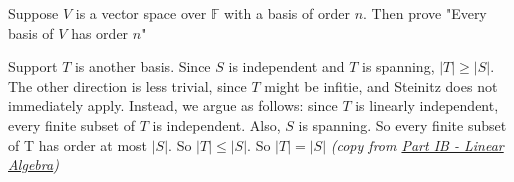 \documentclass[10pt, a4paper]{article}
\begin{document}
\begin{question}
Suppose $V$ is a vector space over $\mathbb{F}$ with a basis of order $n$. Then prove "Every basis of $V$ has order $n$" 
\end{question}

\begin{My Answer}
Support $T$ is another basis. Since $S$ is independent and $T$ is spanning, $|T| \geq |S|$. The other direction is less trivial, since $T$ might be infitie, and Steinitz does not immediately apply.  Instead, we argue as follows: since $T$ is
linearly independent, every finite subset of $T$ is independent. Also, $S$ is spanning. So every finite subset of T has order at most $|S|$. So $|T| \leq |S|$.
So $|T| = |S|$ \textit{(copy from \href{https://dec41.user.srcf.net/notes/IB_M/linear_algebra_thm_proof.pdf}{Part IB - Linear Algebra})}
\end{My Answer}
\end{document}
